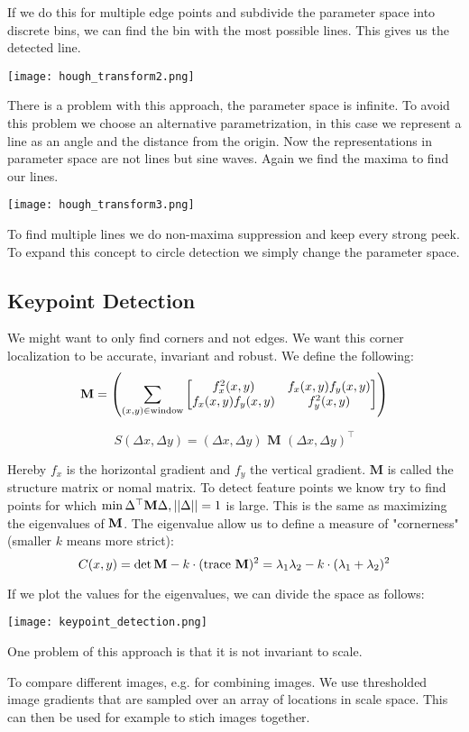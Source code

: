 If we do this for multiple edge points and subdivide the parameter space into discrete bins, we can find the bin with the most possible lines. This gives us the detected line.
\begin{center}
	\texttt{[image: hough\_transform2.png]}
\end{center}

There is a problem with this approach, the parameter space is infinite. To avoid this problem we choose an alternative parametrization, in this case we represent a line as an angle and the distance from the origin. Now the representations in parameter space are not lines but sine waves. Again we find the maxima to find our lines.
\begin{center}
	\texttt{[image: hough\_transform3.png]}
\end{center}

To find multiple lines we do non-maxima suppression and keep every strong peek. To expand this concept to circle detection we simply change the parameter space.


\subsection{Keypoint Detection}

We might want to only find corners and not edges. We want this corner localization to be accurate, invariant and robust. We define the following:
$$\textbf M = \left( \sum_{(x,y) \in \text{window}} 
\begin{bmatrix}
    f_x^2(x,y) & f_x(x,y) f_y(x,y) \\
    f_x(x,y) f_y(x,y) & f_y^2(x,y)
\end{bmatrix}
\right)$$

$$S(\Delta x, \Delta y) = (\Delta x, \Delta y) \textbf{ M } (\Delta x, \Delta y)^\top$$

Hereby $f_x$ is the horizontal gradient and $f_y$ the vertical gradient. $\textbf{M}$ is called the structure matrix or nomal matrix. To detect feature points we know try to find points for which $\min \Delta^\top \textbf M \Delta, || \Delta || = 1 $ is large. This is the same as maximizing the eigenvalues of $\textbf M$. The eigenvalue allow us to define a measure of "cornerness" (smaller $k$ means more strict):
$$C(x,y) = \det \textbf M - k \cdot (\text{trace } \textbf M)^2 = \lambda_1 \lambda_2 - k \cdot (\lambda_1 + \lambda_2)^2$$

If we plot the values for the eigenvalues, we can divide the space as follows:
\begin{center}
	\texttt{[image: keypoint\_detection.png]}
\end{center}

One problem of this approach is that it is not invariant to scale. \medskip

To compare different images, e.g. for combining images. We use thresholded image gradients that are sampled over an array of locations in scale space. This can then be used for example to stich images together.






